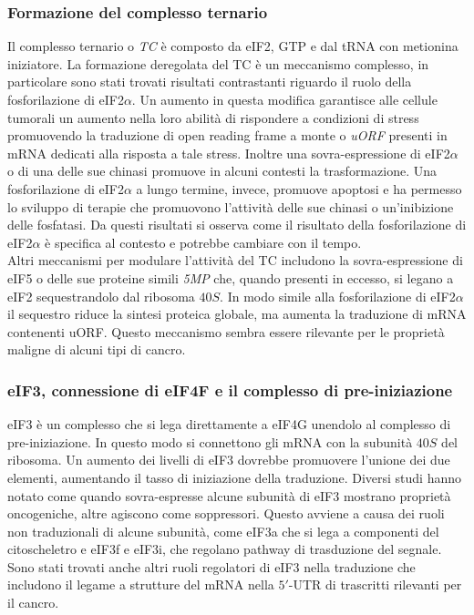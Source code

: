 		\subsubsection{Formazione del complesso ternario}
		Il complesso ternario o \emph{TC} \`e composto da eIF2, GTP e dal tRNA con metionina iniziatore.
		La formazione deregolata del TC \`e un meccanismo complesso, in particolare sono stati trovati risultati contrastanti riguardo il ruolo della fosforilazione di eIF2$\alpha$.
		Un aumento in questa modifica garantisce alle cellule tumorali un aumento nella loro abilit\`a di rispondere a condizioni di stress promuovendo la traduzione di open reading frame a monte o \emph{uORF} presenti in mRNA dedicati alla risposta a tale stress.
		Inoltre una sovra-espressione di eIF2$\alpha$ o di una delle sue chinasi promuove in alcuni contesti la trasformazione.
		Una fosforilazione di eIF2$\alpha$ a lungo termine, invece, promuove apoptosi e ha permesso lo sviluppo di terapie che promuovono l'attivit\`a delle sue chinasi o un'inibizione delle fosfatasi.
		Da questi risultati si osserva come il risultato della fosforilazione di eIF2$\alpha$ \`e specifica al contesto e potrebbe cambiare con il tempo.\\
		Altri meccanismi per modulare l'attivit\`a del TC includono la sovra-espressione di eIF5 o delle sue proteine simili \emph{5MP} che, quando presenti in eccesso, si legano a eIF2 sequestrandolo dal ribosoma $40S$.
		In modo simile alla fosforilazione di eIF2$\alpha$ il sequestro riduce la sintesi proteica globale, ma aumenta la traduzione di mRNA contenenti uORF.
		Questo meccanismo sembra essere rilevante per le propriet\`a maligne di alcuni tipi di cancro.

		\subsubsection{eIF3, connessione di eIF4F e il complesso di pre-iniziazione}
		eIF3 \`e un complesso che si lega direttamente a eIF4G unendolo al complesso di pre-iniziazione.
		In questo modo si connettono gli mRNA con la subunit\`a $40S$ del ribosoma.
		Un aumento dei livelli di eIF3 dovrebbe promuovere l'unione dei due elementi, aumentando il tasso di iniziazione della traduzione.
		Diversi studi hanno notato come quando sovra-espresse alcune subunit\`a di eIF3 mostrano propriet\`a oncogeniche, altre agiscono come soppressori.
		Questo avviene a causa dei ruoli non traduzionali di alcune subunit\`a, come eIF3a che si lega a componenti del citoscheletro e eIF3f e eIF3i, che regolano pathway di trasduzione del segnale.
		Sono stati trovati anche altri ruoli regolatori di eIF3 nella traduzione che includono il legame a strutture del mRNA nella $5'$-UTR di trascritti rilevanti per il cancro.

